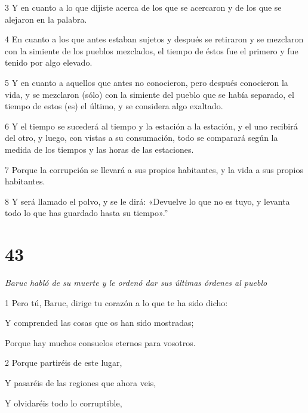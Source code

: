 \par 3 Y en cuanto a lo que dijiste acerca de los que se acercaron y de los que se alejaron en la palabra.

\par 4 En cuanto a los que antes estaban sujetos y después se retiraron y se mezclaron con la simiente de los pueblos mezclados, el tiempo de éstos fue el primero y fue tenido por algo elevado.

\par 5 Y en cuanto a aquellos que antes no conocieron, pero después conocieron la vida, y se mezclaron (sólo) con la simiente del pueblo que se había separado, el tiempo de estos (es) el último, y se considera algo exaltado.

\par 6 Y el tiempo se sucederá al tiempo y la estación a la estación, y el uno recibirá del otro, y luego, con vistas a su consumación, todo se comparará según la medida de los tiempos y las horas de las estaciones.

\par 7 Porque la corrupción se llevará a sus propios habitantes, y la vida a sus propios habitantes.

\par 8 Y será llamado el polvo, y se le dirá: «Devuelve lo que no es tuyo, y levanta todo lo que has guardado hasta su tiempo».''


\chapter{43}

\par \textit{Baruc habló de su muerte y le ordenó dar sus últimas órdenes al pueblo}

\par 1 Pero tú, Baruc, dirige tu corazón a lo que te ha sido dicho:

\par Y comprended las cosas que os han sido mostradas;

\par Porque hay muchos consuelos eternos para vosotros.

\par 2 Porque partiréis de este lugar,

\par Y pasaréis de las regiones que ahora veis,

\par Y olvidaréis todo lo corruptible,

